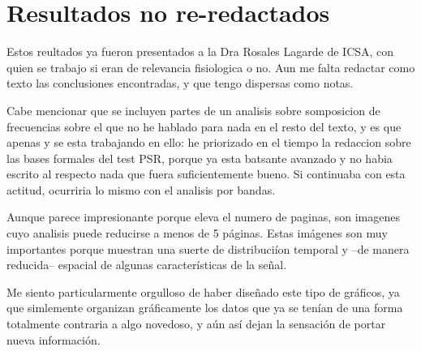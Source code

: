 \documentclass[12pt,a4paper]{mitthesis}
\begin{document}
\pagestyle{plain}

\newtheorem{defn}{Definici\'on}

\newcommand{\R}{\mathbb{R}}
\newcommand{\Var}[1]{\mathrm{Var}\left( #1 \right)}
\newcommand{\Cov}[1]{\mathrm{Cov}\left( #1 \right)}
\newcommand{\abso}[1]{\lvert #1 \rvert}


\tableofcontents
\newpage












\appendix

\chapter{Resultados no re-redactados}

Estos reultados ya fueron presentados a la Dra Rosales Lagarde de ICSA, con quien se
trabajo si eran de relevancia fisiologica o no. Aun me falta redactar como texto las conclusiones
encontradas, y que tengo dispersas como notas. 

Cabe mencionar que se incluyen partes de un analisis
sobre somposicion de frecuencias sobre el que no he hablado para nada en el resto del texto,
y es que apenas y se esta trabajando en ello: he priorizado en el tiempo la redaccion
sobre  las bases
formales del test PSR, porque ya esta batsante avanzado y no habia escrito al respecto nada que fuera
suficientemente bueno. Si continuaba con esta actitud, ocurriria lo mismo con el analisis por bandas.

Aunque parece impresionante porque eleva el numero de paginas, son imagenes cuyo analisis puede 
reducirse a menos de 5 p\'aginas. Estas im\'agenes son muy importantes
porque muestran una suerte de distribuci\'ion temporal y --de manera reducida-- espacial 
de algunas caracter\'isticas de la se\~nal. 

Me siento particularmente orgulloso
de haber dise\~nado este tipo de gr\'aficos, ya que 
simlemente organizan
gr\'aficamente los datos que ya se ten\'ian de una forma
totalmente contraria a algo novedoso,
y a\'un as\'i dejan la sensaci\'on de portar nueva informaci\'on.
\end{document}
